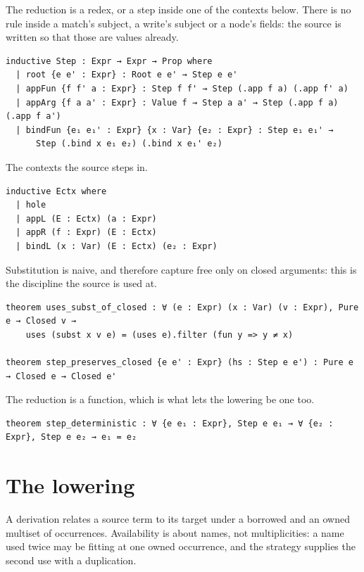 \documentclass[11pt]{article}
\theoremstyle{remark}
\begin{document}
\noindent The reduction is a redex, or a step inside one of the contexts below.
There is no rule inside a match's subject, a write's subject or a node's fields:
the source is written so that those are values already.

\begin{lstlisting}
inductive Step : Expr → Expr → Prop where
  | root {e e' : Expr} : Root e e' → Step e e'
  | appFun {f f' a : Expr} : Step f f' → Step (.app f a) (.app f' a)
  | appArg {f a a' : Expr} : Value f → Step a a' → Step (.app f a) (.app f a')
  | bindFun {e₁ e₁' : Expr} {x : Var} {e₂ : Expr} : Step e₁ e₁' →
      Step (.bind x e₁ e₂) (.bind x e₁' e₂)
\end{lstlisting}

\noindent The contexts the source steps in.

\begin{lstlisting}
inductive Ectx where
  | hole
  | appL (E : Ectx) (a : Expr)
  | appR (f : Expr) (E : Ectx)
  | bindL (x : Var) (E : Ectx) (e₂ : Expr)
\end{lstlisting}

\noindent Substitution is naive, and therefore capture free only on closed
arguments: this is the discipline the source is used at.

\begin{lstlisting}
theorem uses_subst_of_closed : ∀ (e : Expr) (x : Var) (v : Expr), Pure e → Closed v →
    uses (subst x v e) = (uses e).filter (fun y => y ≠ x)

theorem step_preserves_closed {e e' : Expr} (hs : Step e e') : Pure e → Closed e → Closed e'
\end{lstlisting}

\noindent The reduction is a function, which is what lets the lowering be one too.

\begin{lstlisting}
theorem step_deterministic : ∀ {e e₁ : Expr}, Step e e₁ → ∀ {e₂ : Expr}, Step e e₂ → e₁ = e₂
\end{lstlisting}

\section{The lowering}
\label{sec:lower}

\noindent A derivation relates a source term to its target under a borrowed and an
owned multiset of occurrences. Availability is about names, not multiplicities: a
name used twice may be fitting at one owned occurrence, and the strategy supplies
the second use with a duplication.
\end{document}
